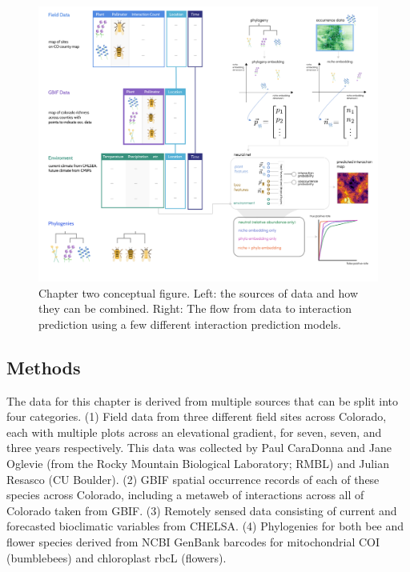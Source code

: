 \documentclass[11pt]{article}
\makeatletter
\def\maxwidth{\ifdim\Gin@nat@width>\linewidth\linewidth
\else\Gin@nat@width\fi}
\let\Oldincludegraphics\includegraphics
\renewcommand{\includegraphics}[1]{\Oldincludegraphics[width=\maxwidth]{#1}}
\makeatother
\begin{document}
\begin{figure}
\centering
\includegraphics{./figures/ch1.png}
\caption{Chapter two conceptual figure. Left: the sources of data and
how they can be combined. Right: The flow from data to interaction
prediction using a few different interaction prediction models.}
\end{figure}

\hypertarget{methods-1}{%
\subsection{Methods}\label{methods-1}}

The data for this chapter is derived from multiple sources that can be
split into four categories. (1) Field data from three different field
sites across Colorado, each with multiple plots across an elevational
gradient, for seven, seven, and three years respectively. This data was
collected by Paul CaraDonna and Jane Oglevie (from the Rocky Mountain
Biological Laboratory; RMBL) and Julian Resasco (CU Boulder). (2) GBIF
spatial occurrence records of each of these species across Colorado,
including a metaweb of interactions across all of Colorado taken from
GBIF. (3) Remotely sensed data consisting of current and forecasted
bioclimatic variables from CHELSA. (4) Phylogenies for both bee and
flower species derived from NCBI GenBank barcodes for mitochondrial COI
(bumblebees) and chloroplast rbcL (flowers).
\end{document}
